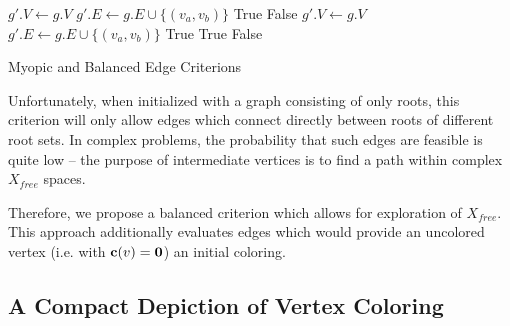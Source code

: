 \documentclass{report}
\begin{document}
\begin{algorithm}[t!]
\begin{algorithmic}[1]
\State $g'.V \leftarrow g.V$
\State $g'.E \leftarrow g.E \cup \{(v_a, v_b)\}$
\State \Return True
\Else
\State \Return False
\EndIf
\EndFunction
{}%
\State $g'.V \leftarrow g.V$
\State $g'.E \leftarrow g.E \cup \{(v_a, v_b)\}$
\State \Return True
\State \Return True
\Else
\State \Return False
\EndIf
\EndFunction
\end{algorithmic}
\caption{Myopic and Balanced Edge Criterions}
\label{alg:criterion}
\end{algorithm}

Unfortunately, when initialized with a graph consisting of only
roots,
this criterion will only allow edges which connect directly
between roots of different root sets.
In complex problems, the probability that such edges are feasible
is quite low --
the purpose of intermediate vertices is to find a path within
complex $X_{free}$ spaces.

Therefore, we propose a balanced criterion which allows for exploration
of $X_{free}$.
This approach additionally evaluates edges which would provide an
uncolored vertex (i.e. with ${\bf c}(v) = {\bf 0}$) an initial coloring.

\subsection{A Compact Depiction of Vertex Coloring}
\end{document}
